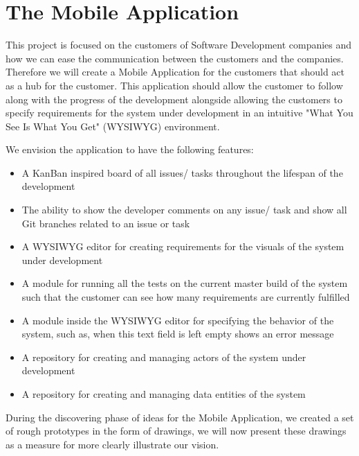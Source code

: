 \section{The Mobile Application}
This project is focused on the customers of Software Development companies and how we can ease the communication between the customers and the companies.
Therefore we will create a Mobile Application for the customers that should act as a hub for the customer. 
This application should allow the customer to follow along with the progress of the development alongside allowing the customers to specify requirements for the system under development in an intuitive "What You See Is What You Get" (WYSIWYG) environment.

We envision the application to have the following features:

\begin{itemize}
    \item A KanBan inspired board of all issues/ tasks throughout the lifespan of the development
    \item The ability to show the developer comments on any issue/ task and show all Git branches related to an issue or task
    \item A WYSIWYG editor for creating requirements for the visuals of the system under development
    \item A module for running all the tests on the current master build of the system such that the customer can see how many requirements are currently fulfilled
    \item A module inside the WYSIWYG editor for specifying the behavior of the system, such as, when this text field is left empty shows an error message
    \item A repository for creating and managing actors of the system under development
    \item A repository for creating and managing data entities of the system
\end{itemize}

During the discovering phase of ideas for the Mobile Application, we created a set of rough prototypes in the form of drawings, we will now present these drawings as a measure for more clearly illustrate our vision.


